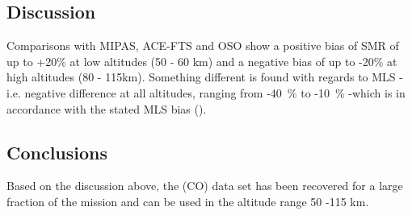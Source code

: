 \subsection{Discussion}
\label{sec:fm22:discussion}
Comparisons with MIPAS, ACE-FTS and OSO show a positive bias of SMR of up to +20\% at low altitudes (50 - 60 km) and a negative bias of up to -20\% at high altitudes (80 - 115km). Something different is found with regards to MLS - i.e. negative difference at all altitudes, ranging from -40~\% to -10~\% -which is in accordance with the stated MLS bias (\cite{Errera2019}).



\subsection{Conclusions}
\label{sec:fm22:conclusions}
Based on the discussion above, the \chem(CO) data set has been recovered for a large fraction of the mission and can be used in the altitude range 50 -115 km.
